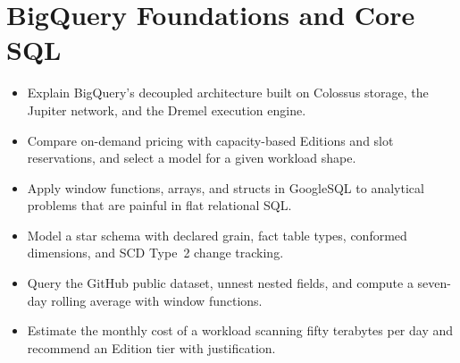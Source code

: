\chapter{BigQuery Foundations and Core SQL}

\begin{objectives}
\begin{itemize}
    \item Explain BigQuery's decoupled architecture built on Colossus storage, the Jupiter network, and the Dremel execution engine.
    \item Compare on-demand pricing with capacity-based Editions and slot reservations, and select a model for a given workload shape.
    \item Apply window functions, arrays, and structs in GoogleSQL to analytical problems that are painful in flat relational SQL.
    \item Model a star schema with declared grain, fact table types, conformed dimensions, and SCD Type~2 change tracking.
    \item Query the GitHub public dataset, unnest nested fields, and compute a seven-day rolling average with window functions.
    \item Estimate the monthly cost of a workload scanning fifty terabytes per day and recommend an Edition tier with justification.
\end{itemize}
\end{objectives}

